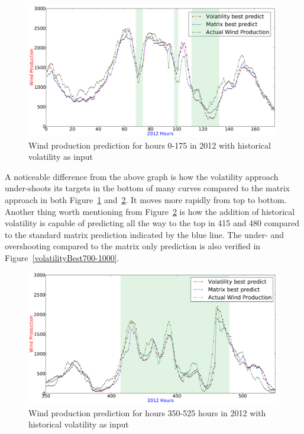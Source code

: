 \begin{figure}[H]
\centering
\includegraphics[width=0.99\textwidth]{billeder/bestVolatilityVsMatrixGraph.png}
\caption{Wind production prediction for hours 0-175 in 2012 with historical volatility as input}
\label{fig:bestVolatilityVsMatrixGraph}
\end{figure} 

A noticeable difference from the above graph is how the volatility approach under-shoots its targets in the bottom of many curves compared to the matrix approach in both Figure~\ref{fig:bestVolatilityVsMatrixGraph} and~\ref{fig:bestVolatilityVsMatrixGraph350-525}. It moves more rapidly from top to bottom. Another thing worth mentioning from Figure~\ref{fig:bestVolatilityVsMatrixGraph350-525} is how the addition of historical volatility is capable of predicting all the way to the top in 415 and 480 compared to the standard matrix prediction indicated by the blue line. The under- and overshooting compared to the matrix only prediction is also verified in Figure~\ref{volatilityBest700-1000}.

\begin{figure}[H]
\centering
\includegraphics[width=0.99\textwidth]{billeder/bestVolatilityVsMatrixGraph350-525.png}
\caption{Wind production prediction for hours 350-525 hours in 2012 with historical volatility as input}
\label{fig:bestVolatilityVsMatrixGraph350-525}
\end{figure} 

